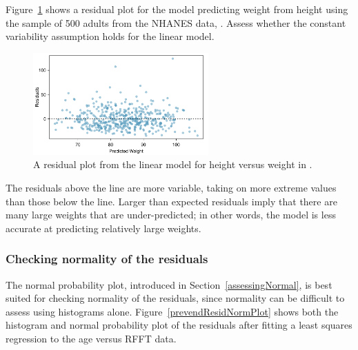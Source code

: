 \newpage

\begin{example}{
Figure~\ref{nhanesHeightWeightResidualPlot} shows a residual plot for the model predicting weight from height using the sample of 500 adults from the NHANES data, . Assess whether the constant variability assumption holds for the linear model.
\begin{figure}[h!]
	\centering
	\includegraphics[width=0.6\textwidth]
	{ch_simple_linear_regression_oi_biostat/figures/nhanesHeightWeightResidualPlot/nhanesHeightWeightResidualPlot.pdf}
	\caption{A residual plot from the linear model for height versus weight in .}
	\label{nhanesHeightWeightResidualPlot}
	\end{figure}
}

The residuals above the line are more variable, taking on more extreme values than those below the line. Larger than expected residuals imply that there are many large weights that are under-predicted; in other words, the model is less accurate at predicting relatively large weights.
	
\end{example}



\subsubsection{Checking normality of the residuals}



The normal probability plot, introduced in Section~\ref{assessingNormal}, is best suited for checking normality of the residuals, since normality can be difficult to assess using histograms alone. Figure~\ref{prevendResidNormPlot} shows both the histogram and normal probability plot of the residuals after fitting a least squares regression to the age versus RFFT data.  
 
